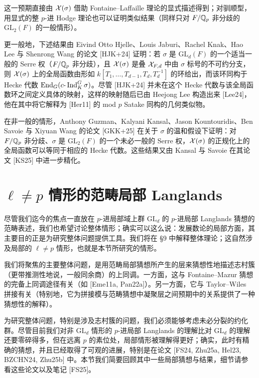 这一预期直接由 $\mathcal{X}(\sigma)$ 借助 Fontaine--Laffaille 理论的显式描述得到；对驯顺型，用显式的整 $p$-进 Hodge 理论也可以证明类似结果（同样只对 $F/\mathbb{Q}_p$ 非分歧的 $\mathrm{GL}_2(F)$ 的一般情形）。

更一般地，下述结果由 Eivind Otto Hjelle、Louis Jaburi、Rachel Knak、Hao Lee 与 Shenrong Wang 的论文 [HJK+24] 证明：若 $\sigma$ 是 $\mathrm{GL}_d(F)$ 的一个适当一般的 Serre 权（$F/\mathbb{Q}_p$ 非分歧），且 $\mathcal{X}(\sigma)$ 是叠 $\mathcal{X}_{F,d}$ 中由 $\sigma$ 标号的不可约分支，则 $\mathcal{X}(\sigma)$ 上的全局函数由形如 $k[T_1,\dots,T_{d-1},T_d,T_d^{-1}]$ 的环给出，而该环同构于 Hecke 代数 $\operatorname{End}_G(c\text{-}\operatorname{Ind}_K^G\sigma)$。尽管 [HJK+24] 并未在这个 Hecke 代数与该全局函数环之间定义具体的映射，这样的映射随后已由 Heejong Lee 构造出来 [Lee24]，他在其中将它解释为 [Her11] 的 mod $p$ Satake 同构的几何类似物。

在非一般的情形，Anthony Guzman、Kalyani Kansal、Jason Kountouridis、Ben Savoie 与 Xiyuan Wang 的论文 [GKK+25] 在关于 $\sigma$ 的温和假设下证明：对 $F/\mathbb{Q}_p$ 非分歧、$\sigma$ 是 $\mathrm{GL}_2(F)$ 的一个未必一般的 Serre 权，$\mathcal{X}(\sigma)$ 的正规化上的全局函数可以等同于相应的 Hecke 代数。这些结果又由 Kansal 与 Savoie 在其论文 [KS25] 中进一步精化。

\section{$\ell\neq p$ 情形的范畴局部 Langlands}

尽管我们迄今的焦点一直放在 $p$-进局部域上群 $\mathrm{GL}_d$ 的 $p$-进局部 Langlands 猜想的范畴表述，我们也希望讨论整体情形；确实可以这么说：发展数论的局部方面，其主要目的正是为研究整体问题提供工具。我们将在 §9 中解释整体理论；这自然涉及局部的 $\ell\neq p$ 情形，也就是本节所研究的情形。

我们将聚焦的主要整体问题，是用范畴局部猜想所产生的层来猜想性地描述志村簇（更带推测性地说，一般同余商）的上同调。一方面，这与 Fontaine--Mazur 猜想的完备上同调途径有关（如 [Eme11a, Pan22a]）。另一方面，它与 Taylor--Wiles 拼接有关（特别地，它为拼接模与范畴猜想中凝聚层之间预期中的关系提供了一种猜想性的解释）。

为研究整体问题，特别是涉及志村簇的问题，我们必须能够考虑未必分裂的约化群。尽管目前我们对非 $\mathrm{GL}_d$ 情形的 $p$-进局部 Langlands 的理解比对 $\mathrm{GL}_d$ 的理解还要零碎得多，但在远离 $p$ 的素位处，局部情形被理解得更好；确实，此时有精确的猜想，并且已经取得了可观的进展，特别是在论文 [FS24, Zhu25a, Hel23, BZCHN24, Zhu25b] 中。本节我们简要回顾其中一些局部猜想与结果，细节请参看这些论文以及笔记 [FS25]。

